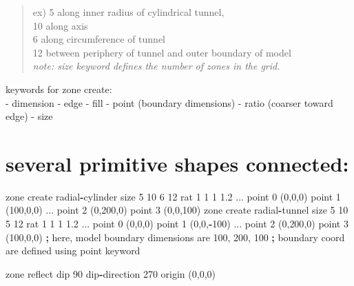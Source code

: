 \documentclass[a4paper, nobind]{templates/ociamthesis}
\newenvironment{Shaded}{\begin{snugshade}}{\end{snugshade}}
\newcommand{\DecValTok}[1]{\textcolor[rgb]{0.00,0.00,0.81}{#1}}
\newcommand{\FloatTok}[1]{\textcolor[rgb]{0.00,0.00,0.81}{#1}}
\newcommand{\NormalTok}[1]{#1}
\newcommand{\OperatorTok}[1]{\textcolor[rgb]{0.81,0.36,0.00}{\textbf{#1}}}
\renewenvironment{Shaded}
{
  \vspace{10pt}%
  \begin{snugshade}%
}{%
  \end{snugshade}%
  \vspace{8pt}%
}
\begin{document}
\begin{quote}
ex) 5 along inner radius of cylindrical tunnel,\\
10 along axis\\
6 along circumference of tunnel\\
12 between periphery of tunnel and outer boundary of model\\
\emph{note: size keyword defines the number of zones in the grid.}
\end{quote}

keywords for zone create:\\
- dimension - edge - fill - point (boundary dimensions) - ratio (coarser
toward edge) - size

\hypertarget{several-primitive-shapes-connected}{%
\section{several primitive shapes connected:}\label{several-primitive-shapes-connected}}

\begin{Shaded}
\begin{Highlighting}[]
\NormalTok{zone create radial}\OperatorTok{{-}}\NormalTok{cylinder size }\DecValTok{5} \DecValTok{10} \DecValTok{6} \DecValTok{12}\NormalTok{ rat }\DecValTok{1} \DecValTok{1} \DecValTok{1} \FloatTok{1.2}\NormalTok{ ...}
\NormalTok{                           point }\DecValTok{0}\NormalTok{ (}\DecValTok{0}\NormalTok{,}\DecValTok{0}\NormalTok{,}\DecValTok{0}\NormalTok{) point }\DecValTok{1}\NormalTok{ (}\DecValTok{100}\NormalTok{,}\DecValTok{0}\NormalTok{,}\DecValTok{0}\NormalTok{) ...}
\NormalTok{                           point }\DecValTok{2}\NormalTok{ (}\DecValTok{0}\NormalTok{,}\DecValTok{200}\NormalTok{,}\DecValTok{0}\NormalTok{) point }\DecValTok{3}\NormalTok{ (}\DecValTok{0}\NormalTok{,}\DecValTok{0}\NormalTok{,}\DecValTok{100}\NormalTok{)}
\NormalTok{zone create radial}\OperatorTok{{-}}\NormalTok{tunnel size }\DecValTok{5} \DecValTok{10} \DecValTok{5} \DecValTok{12}\NormalTok{ rat }\DecValTok{1} \DecValTok{1} \DecValTok{1} \FloatTok{1.2}\NormalTok{ ...}
\NormalTok{                          point }\DecValTok{0}\NormalTok{ (}\DecValTok{0}\NormalTok{,}\DecValTok{0}\NormalTok{,}\DecValTok{0}\NormalTok{) point }\DecValTok{1}\NormalTok{ (}\DecValTok{0}\NormalTok{,}\DecValTok{0}\NormalTok{,}\OperatorTok{{-}}\DecValTok{100}\NormalTok{) ...}
\NormalTok{                          point }\DecValTok{2}\NormalTok{ (}\DecValTok{0}\NormalTok{,}\DecValTok{200}\NormalTok{,}\DecValTok{0}\NormalTok{) point }\DecValTok{3}\NormalTok{ (}\DecValTok{100}\NormalTok{,}\DecValTok{0}\NormalTok{,}\DecValTok{0}\NormalTok{)}
\OperatorTok{;}\NormalTok{ here, model boundary dimensions are }\DecValTok{100}\NormalTok{, }\DecValTok{200}\NormalTok{, }\DecValTok{100}
\OperatorTok{;}\NormalTok{ boundary coord are defined using point keyword}

\NormalTok{zone reflect dip }\DecValTok{90}\NormalTok{ dip}\OperatorTok{{-}}\NormalTok{direction }\DecValTok{270}\NormalTok{ origin (}\DecValTok{0}\NormalTok{,}\DecValTok{0}\NormalTok{,}\DecValTok{0}\NormalTok{) }
\end{Highlighting}
\end{Shaded}
\end{document}
